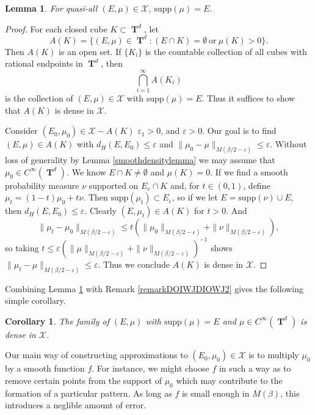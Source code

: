 \documentclass[12pt,reqno]{article}
\numberwithin{equation}{section}
\DeclareMathOperator{\TT}{\mathbf{T}}
\newtheorem{lemma}{Lemma}
\newtheorem{corollary}{Corollary}
\begin{document}
\begin{lemma} \label{lemmaOIJAWDIOJW23232}
    For quasi-all $(E,\mu) \in \mathcal{X}$, $\text{supp}(\mu) = E$.
\end{lemma}
\begin{proof}
    For each closed cube $K \subset \TT^d$, let
    \[ A(K) = \{ (E,\mu) \in \TT^d: (E \cap K) = \emptyset\ \text{or}\ \mu(K) > 0 \}. \]
    Then $A(K)$ is an open set. If $\{ K_i \}$ is the countable collection of all cubes with rational endpoints in $\TT^d$, then
    \[ \bigcap_{i = 1}^\infty A(K_i) \]
    is the collection of $(E,\mu) \in \mathcal{X}$ with $\text{supp}(\mu) = E$. Thus it suffices to show that $A(K)$ is dense in $\mathcal{X}$.

    Consider $(E_0,\mu_0) \in \mathcal{X} - A(K)$ $\varepsilon_1 > 0$, and $\varepsilon > 0$. Our goal is to find $(E,\mu) \in A(K)$ with $d_H(E,E_0) \leq \varepsilon$ and $\| \mu_0 - \mu \|_{M(\beta/2 - \varepsilon)} \leq \varepsilon$. Without loss of generality by Lemma \ref{smoothdensitylemma} we may assume that $\mu_0 \in C^\infty(\TT^d)$. We know $E \cap K \neq \emptyset$ and $\mu(K) = 0$. If we find a smooth probability measure $\nu$ supported on $E_\varepsilon \cap K$ and, for $t \in (0,1)$, define $\mu_t = (1 - t) \mu_0 + t \nu$. Then $\text{supp}(\mu_t) \subset E_\varepsilon$, so if we let $E = \text{supp}(\nu) \cup E$, then $d_H(E,E_0) \leq \varepsilon$. Clearly $(E,\mu_t) \in A(K)$ for $t > 0$. And
    \[ \| \mu_t - \mu_0 \|_{M(\beta/2 - \varepsilon)} \leq t \left( \| \mu_0 \|_{M(\beta/2 - \varepsilon)} + \| \nu \|_{M(\beta/2 - \varepsilon)} \right), \]
    so taking $t \leq \varepsilon (\| \mu \|_{M(\beta/2 - \varepsilon)} + \| \nu \|_{M(\beta/2 - \varepsilon)})^{-1}$ shows $\| \mu_t - \mu \|_{M(\beta/2 - \varepsilon)} \leq \varepsilon$. Thus we conclude $A(K)$ is dense in $\mathcal{X}$.
\end{proof}

Combining Lemma \ref{lemmaOIJAWDIOJW23232} with Remark \ref{remarkDOIWJDIOWJ2} gives the following simple corollary.

\begin{corollary} \label{corollaryOIDJOWIJD2212}
    The family of $(E,\mu)$ with $\text{supp}(\mu) = E$ and $\mu \in C^\infty(\TT^d)$ is dense in $\mathcal{X}$.
\end{corollary}

Our main way of constructing approximations to $(E_0,\mu_0) \in \mathcal{X}$ is to multiply $\mu_0$ by a smooth function $f$. For instance, we might choose $f$ in such a way as to remove certain points from the support of $\mu_0$ which may contribute to the formation of a particular pattern. As long as $f$ is small enough in $M(\beta)$, this introduces a neglible amount of error.
\end{document}
